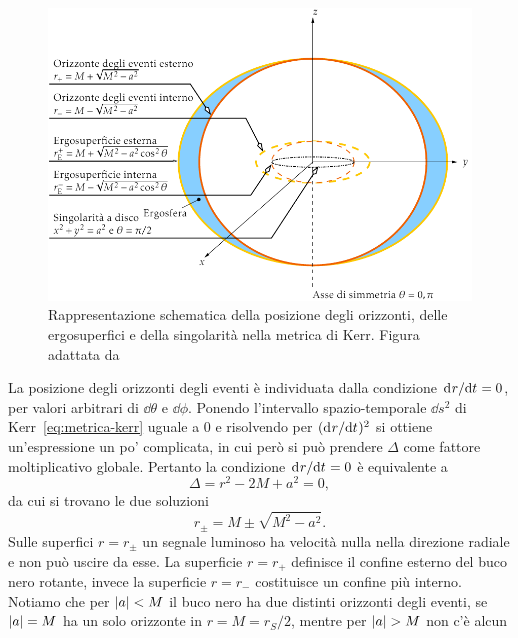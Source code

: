 \begin{figure}
  \centering
  \includegraphics[width=\textwidth]{figure/kerr}
  \caption[Rappresentazione schematica della posizione degli orizzonti, delle
  ergosuperfici e della singolarità nella metrica di Kerr]{Rappresentazione
    schematica della posizione degli orizzonti, delle ergosuperfici e della
    singolarità nella metrica di Kerr.  Figura adattata
    da~\textcite{2007arXiv0706.0622V}}
  \label{fig:geometria-kerr}
\end{figure}
La posizione degli orizzonti degli eventi è individuata dalla condizione
\(\mathrm{d}^{}r / \mathrm{d} {t}^{} = 0\), per valori arbitrari di \(\dd\theta\) e \(\dd\phi\).
Ponendo l'intervallo spazio-temporale \(\dd s^{2}\) di
Kerr~\eqref{eq:metrica-kerr} uguale a \(0\) e risolvendo per
\((\mathrm{d}^{}r / \mathrm{d} {t}^{})^{2}\) si ottiene un'espressione un po' complicata, in cui però
si può prendere \(\Delta\) come fattore moltiplicativo globale.  Pertanto la
condizione \(\mathrm{d}^{}r / \mathrm{d} {t}^{} = 0\) è equivalente a
\begin{equation}
  \Delta = r^{2} - 2M + a^{2} = 0,
\end{equation}
da cui si trovano le due soluzioni
\begin{equation}
  r_{\pm} = M \pm \sqrt{M^{2} - a^{2}}.
\end{equation}
Sulle superfici \(r = r_{\pm}\) un segnale luminoso ha velocità nulla nella
direzione radiale e non può uscire da esse.  La superficie \(r = r_{+}\)
definisce il confine esterno del buco nero rotante, invece la superficie \(r =
r_{-}\) costituisce un confine più interno.  Notiamo che per \(\lvert a\rvert < M\) il
buco nero ha due distinti orizzonti degli eventi, se \(\lvert a\rvert = M\) ha un solo
orizzonte in \(r = M = r_{S}/2\), mentre per \(\lvert a\rvert > M\) non c'è alcun
